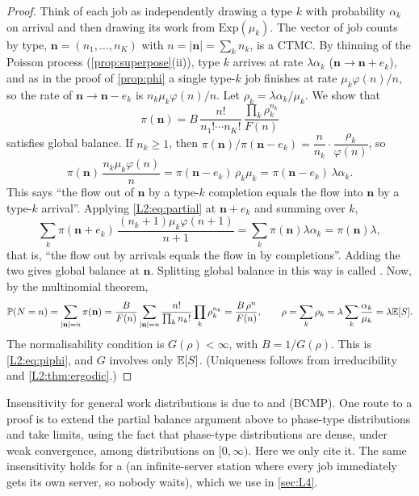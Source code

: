 \begin{proof}
Think of each job as independently drawing a type $k$ with probability $\alpha_k$ on
arrival and then drawing its work from $\mathrm{Exp}(\mu_k)$. The vector of job counts
by type, $\mathbf n=(n_1,\dots,n_K)$ with $n=|\mathbf n|=\sum_kn_k$, is a CTMC. By
thinning of the Poisson process (\cref{prop:superpose}(ii)), type $k$ arrives at rate
$\lambda\alpha_k$ ($\mathbf n\to\mathbf n+e_k$), and as in the proof of \cref{prop:phi}
a single type-$k$ job finishes at rate $\mu_k\varphi(n)/n$, so the rate of
$\mathbf n\to\mathbf n-e_k$ is $n_k\mu_k\varphi(n)/n$.
Let $\rho_k=\lambda\alpha_k/\mu_k$. We show that
\[
  \pi(\mathbf n)=B\,\frac{n!}{n_1!\cdots n_K!}\,\frac{\prod_k\rho_k^{n_k}}{F(n)}
\]
satisfies global balance. If $n_k\ge1$, then
$\pi(\mathbf n)/\pi(\mathbf n-e_k)=\dfrac{n}{n_k}\cdot\dfrac{\rho_k}{\varphi(n)}$, so
\begin{equation}\label{L2:eq:partial}
  \pi(\mathbf n)\,\frac{n_k\mu_k\varphi(n)}{n}=\pi(\mathbf n-e_k)\,\rho_k\mu_k=\pi(\mathbf n-e_k)\,\lambda\alpha_k .
\end{equation}
This says ``the flow out of $\mathbf n$ by a type-$k$ completion equals the flow into
$\mathbf n$ by a type-$k$ arrival''. Applying \eqref{L2:eq:partial} at
$\mathbf n+e_k$ and summing over $k$,
\[
  \sum_k\pi(\mathbf n+e_k)\,\frac{(n_k+1)\mu_k\varphi(n+1)}{n+1}=\sum_k\pi(\mathbf n)\lambda\alpha_k=\pi(\mathbf n)\lambda ,
\]
that is, ``the flow out by arrivals equals the flow in by completions''. Adding the two
gives global balance at $\mathbf n$. Splitting global balance in this way is called
. Now, by the multinomial theorem,
\[
  \mathbb{P}(N=n)=\sum_{|\mathbf n|=n}\pi(\mathbf n)=\frac{B}{F(n)}\sum_{|\mathbf n|=n}\frac{n!}{\prod_kn_k!}\prod_k\rho_k^{n_k}
  =\frac{B\,\rho^n}{F(n)},\qquad \rho=\sum_k\rho_k=\lambda\sum_k\frac{\alpha_k}{\mu_k}=\lambda\mathbb{E}[S].
\]
The normalisability condition is $G(\rho)<\infty$, with $B=1/G(\rho)$. This is
\eqref{L2:eq:piphi}, and $G$ involves only $\mathbb{E}[S]$.
(Uniqueness follows from irreducibility and \cref{L2:thm:ergodic}.)
\end{proof}

\begin{remark}
Insensitivity for general work distributions is due to \cite{kelly1979} and
\cite{bcmp1975} (BCMP). One route to a proof is to extend the partial balance argument
above to phase-type distributions and take limits, using the fact that phase-type
distributions are dense, under weak convergence, among distributions on $[0,\infty)$.
Here we only cite it.
The same insensitivity holds for a  (an infinite-server station
where every job immediately gets its own server, so nobody waits), which we use in
\cref{sec:L4}.
\end{remark}

